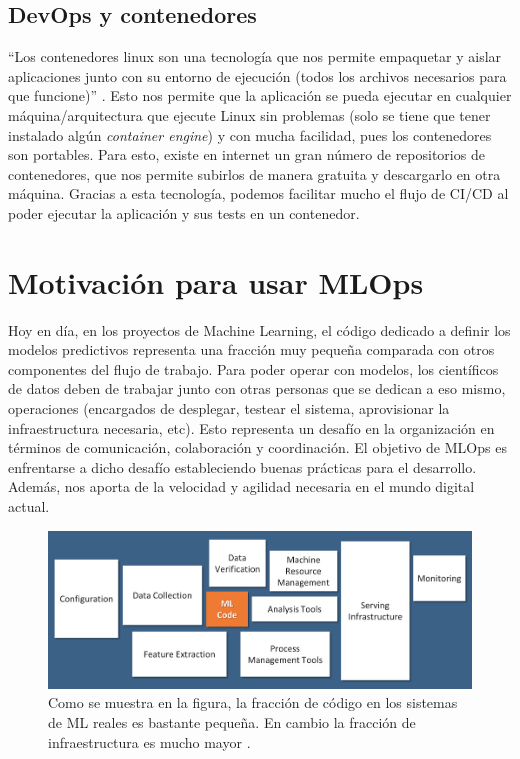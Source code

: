 \subsection{DevOps y contenedores}

\enquote{Los contenedores linux son una tecnología que nos permite empaquetar y aislar aplicaciones junto con su entorno de ejecución (todos los archivos necesarios para que funcione)} \cite{containers}. Esto nos permite que la aplicación se pueda ejecutar en cualquier máquina/arquitectura que ejecute Linux sin problemas (solo se tiene que tener instalado algún \textit{container engine}) y con mucha facilidad, pues los contenedores son portables. Para esto, existe en internet un gran número de repositorios de contenedores, que  nos permite subirlos de manera gratuita y descargarlo en otra máquina. Gracias a esta tecnología, podemos facilitar mucho el flujo de CI/CD al poder ejecutar la aplicación y sus tests en un contenedor.\newline

\section{Motivación para usar MLOps}

Hoy en día, en los proyectos de Machine Learning, el código dedicado a definir los modelos predictivos representa una fracción muy pequeña comparada con otros componentes del flujo de trabajo. Para poder operar con modelos, los científicos de datos deben de trabajar junto con otras personas que se dedican a eso mismo, operaciones (encargados de desplegar, testear el sistema, aprovisionar la infraestructura necesaria, etc). Esto representa un desafío en la organización en términos de comunicación, colaboración y coordinación. El objetivo de MLOps es enfrentarse a dicho desafío estableciendo buenas prácticas para el desarrollo. Además, nos aporta de la velocidad y agilidad necesaria en el mundo digital actual.

\begin{figure}[h]
	\includegraphics[scale=1]{imagenes/01_Introduccion/mlcodefraction.jpg}
	\centering
	\caption{Como se muestra en la figura, la fracción de código en los sistemas de ML reales es bastante pequeña. En cambio la fracción de infraestructura es mucho mayor \cite{NIPS2015_86df7dcf}.}
\end{figure}

